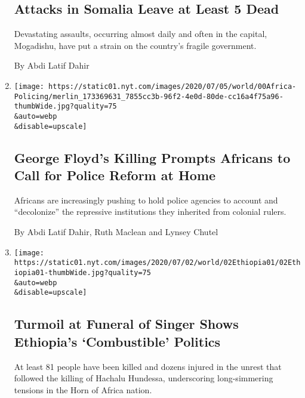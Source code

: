 \begin{enumerate}
  \hypertarget{attacks-in-somalia-leave-at-least-5-dead}{%
  \subsection{Attacks in Somalia Leave at Least 5
  Dead}\label{attacks-in-somalia-leave-at-least-5-dead}}

  Devastating assaults, occurring almost daily and often in the capital,
  Mogadishu, have put a strain on the country's fragile government.

  By Abdi Latif Dahir
\item
  \href{/2020/07/03/world/africa/george-floyd-protests-police-africa.html}{}

  \texttt{[image: https://static01.nyt.com/images/2020/07/05/world/00Africa-Policing/merlin\_173369631\_7855cc3b-96f2-4e0d-80de-cc16a4f75a96-thumbWide.jpg?quality=75\\\&auto=webp\\\&disable=upscale]}

  \hypertarget{george-floyds-killing-prompts-africans-to-call-for-police-reform-at-home}{%
  \subsection{George Floyd's Killing Prompts Africans to Call for Police
  Reform at
  Home}\label{george-floyds-killing-prompts-africans-to-call-for-police-reform-at-home}}

  Africans are increasingly pushing to hold police agencies to account
  and ``decolonize'' the repressive institutions they inherited from
  colonial rulers.

  By Abdi Latif Dahir, Ruth Maclean and Lynsey Chutel
\item
  \href{/2020/07/02/world/africa/ethiopia-singer-funeral-hachalu-killing.html}{}

  \texttt{[image: https://static01.nyt.com/images/2020/07/02/world/02Ethiopia01/02Ethiopia01-thumbWide.jpg?quality=75\\\&auto=webp\\\&disable=upscale]}

  \hypertarget{turmoil-at-funeral-of-singer-shows-ethiopias-combustible-politics}{%
  \subsection{Turmoil at Funeral of Singer Shows Ethiopia's
  `Combustible'
  Politics}\label{turmoil-at-funeral-of-singer-shows-ethiopias-combustible-politics}}

  At least 81 people have been killed and dozens injured in the unrest
  that followed the killing of Hachalu Hundessa, underscoring
  long-simmering tensions in the Horn of Africa nation.


\end{enumerate}
